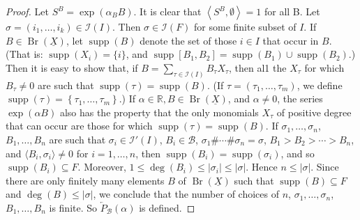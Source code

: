\documentclass[leqno]{article}
\theoremstyle{plain}
\newcommand{\Br}{\operatorname{Br}(\underline{X})}
\begin{document}
\begin{proof}
	Let $S^{B}=\exp \left(\alpha_{B} B\right)$. 
	It is clear that $\left\langle S^{B}, \emptyset\right\rangle=1$ for all B. Let $\sigma=\left(i_{1}, \ldots, i_{k}\right) \in \mathcal{I}(I)$. Then $\sigma \in \mathcal{I}(F)$ for some finite subset of $I$. 
	If $B \in \Br$, let $\operatorname{supp}(B)$ denote the set of those $i \in I$ that occur in $B$. (That is: $\operatorname{supp}\left(X_{i}\right)=\{i\}$, and $\operatorname{supp}\left[B_{1}, B_{2}\right]=\operatorname{supp}\left(B_{1}\right) \cup \operatorname{supp}\left(B_{2}\right)$.) 
	Then it is easy to show that, if $B=\sum_{\tau \in \mathcal{I}(I)} B_{\tau} X_{\tau}$, then al1 the $X_{\tau}$ for which $B_{\tau} \neq 0$ are such that $\operatorname{supp}(\tau)=\operatorname{supp}(B)$. (If $\tau=\left(\tau_{1}, \ldots, \tau_{m}\right)$, we define $\operatorname{supp}(\tau)=\left\{\tau_1, \ldots, \tau_{m}\right\}$.) 
	If $\alpha \in \mathbb{R}, B \in \Br$, and $\alpha \neq 0$, the series $\exp (\alpha B)$ also has the property that the only monomials $X_{\tau}$ of positive degree that can occur are those for which $\operatorname{supp}(\tau)=\operatorname{supp}(B)$. 
	If $\sigma_{1}, \ldots, \sigma_{n}$, $B_{1}, \ldots, B_{n}$ are such that $\sigma_{i} \in \mathcal{I}'(I)$, $B_{i} \in \mathcal{B}$, $\sigma_1\#\dotsb\#\sigma_{n}=\sigma$, $B_{1}>B_{2}>\cdots>B_{n}$, and $\langle B_{i}, \sigma_{i}\rangle\neq 0$ for $i=1, \ldots, n$, then $\operatorname{supp}(B_{i})=\operatorname{supp}\left(\sigma_{i}\right)$, and so $\operatorname{supp}\left(B_{i}\right) \subseteq F$.
	Moreover, $1 \leq \operatorname{deg}\left(B_{i}\right) \leq\left|\sigma_{i}\right| \leq|\sigma|$. Hence $n \leq|\sigma|$. 
	Since there are only finitely many elements $B$ of $\Br$ such that $\operatorname{supp}(B) \subseteq F$ and $\operatorname{deg}(B) \leq|\sigma|$, we conclude that the number of choices of $n$, $\sigma_1, \ldots, \sigma_{n}$, $B_{1}, \ldots, B_{n}$ is finite. 
	So $\overleftarrow{P}_\mathcal{B}(\alpha)$ is defined.


\end{proof}
\end{document}
